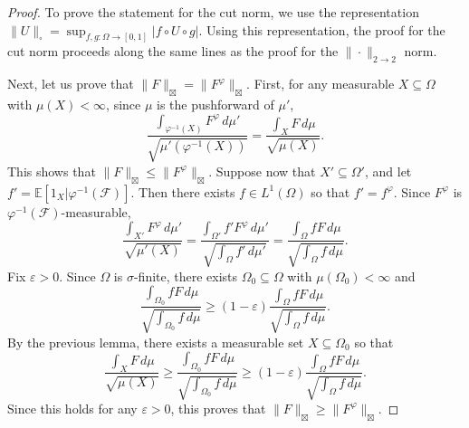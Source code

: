 \documentclass{amsart}
\numberwithin{equation}{section}
\numberwithin{figure}{section}
\theoremstyle{definition}
\theoremstyle{remark}
\newcommand{\jbl}{{\boxtimes}}
\newcommand{\EE}{\mathbb{E}}
\newcommand{\cF}{\mathcal{F}}
\begin{document}
\begin{proof}
To prove the statement for the cut norm, we use the representation $
\|U\|_{\square}=\sup_{f,g\colon\Omega\to [0,1]}| f \circ U \circ g|$. Using
this representation, the proof for the cut norm proceeds along the same lines
as the proof for the $\|\cdot\|_{2 \rightarrow 2}$ norm.

Next, let us prove that $\|F\|_\jbl=\|F^\varphi\|_\jbl$. First, for any
measurable $X \subseteq \Omega$ with $\mu(X)<\infty$, since $\mu$ is the
pushforward of $\mu'$,
\[\frac{\int_{\varphi^{-1}(X)}F^\varphi \,d\mu'}{\sqrt{\mu'(\varphi^{-1}(X))}}=\frac{\int_X F \,d\mu}{\sqrt{\mu(X)}}
.\] This shows that $\|F\|_\jbl \le \|F^\varphi\|_\jbl$. Suppose now that $X'
\subseteq \Omega'$, and let $f'=\EE[1_X|\varphi^{-1}(\cF)]$. Then there
exists $f \in L^1(\Omega)$ so that $f'=f^\varphi$. Since $F^\varphi$ is
$\varphi^{-1}(\cF)$-measurable,
\[\frac{\int_{X'} F^\varphi \,d\mu'}{\sqrt{\mu'(X)}}= \frac{\int_{\Omega'} f' F^\varphi \,d\mu'}{\sqrt{\int_\Omega f' \,d\mu'}}= \frac{\int_\Omega f F \,d\mu}{\sqrt{\int_\Omega f \,d\mu}}
.\] Fix $\varepsilon>0$. Since $\Omega$ is $\sigma$-finite, there exists
$\Omega_0 \subseteq \Omega$ with $\mu(\Omega_0)<\infty$ and
\[
\frac{\int_{\Omega_0} f F \,d\mu}{\sqrt{\int_{\Omega_0} f \,d\mu}}
\ge (1-\varepsilon) \frac{\int_\Omega f F \,d\mu}{\sqrt{\int_\Omega f \,d\mu}}
.\]
By the previous lemma, there exists a measurable set $X \subseteq \Omega_0$ so that
\[\frac{\int_X F \,d\mu}{\sqrt{\mu(X) }} \ge \frac{\int_{\Omega_0} f F \,d\mu}{\sqrt{\int_{\Omega_0} f \,d\mu}}
\ge (1-\varepsilon) \frac{\int_\Omega f F \,d\mu}{\sqrt{\int_\Omega f
\,d\mu}} .\] Since this holds for any $\varepsilon>0$, this proves that
$\|F\|_\jbl \ge \|F^\varphi\|_\jbl$.


\end{proof}
\end{document}
